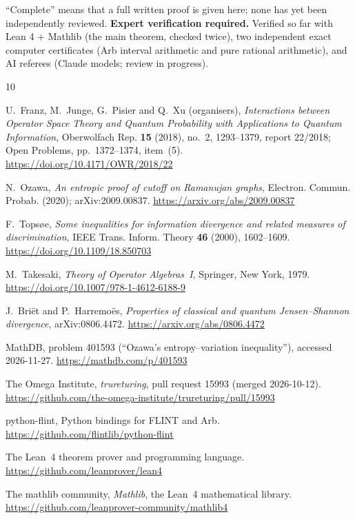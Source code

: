\documentclass[11pt]{amsart}
\theoremstyle{definition}\newtheorem{definition}[theorem]{Definition}
\theoremstyle{remark}\newtheorem{remark}[theorem]{Remark}
\begin{document}
``Complete'' means that a full written proof is given here; none has yet been independently reviewed.  \textbf{Expert verification required.} Verified so far with Lean 4 + Mathlib (the main theorem, checked twice), two independent exact computer certificates (Arb interval arithmetic and pure rational arithmetic), and AI referees (Claude models; review in progress).


\begin{thebibliography}{10}

U.~Franz, M.~Junge, G.~Pisier and Q.~Xu (organisers), \emph{Interactions between Operator Space Theory and Quantum Probability with Applications to Quantum Information}, Oberwolfach Rep. \textbf{15} (2018), no.~2, 1293--1379, report 22/2018; Open Problems, pp.~1372--1374, item~(5).
\url{https://doi.org/10.4171/OWR/2018/22}

N.~Ozawa, \emph{An entropic proof of cutoff on Ramanujan graphs}, Electron. Commun. Probab. (2020); arXiv:2009.00837.
\url{https://arxiv.org/abs/2009.00837}

F.~Tops\o{}e, \emph{Some inequalities for information divergence and related measures of discrimination}, IEEE Trans. Inform. Theory \textbf{46} (2000), 1602--1609.
\url{https://doi.org/10.1109/18.850703}

M.~Takesaki, \emph{Theory of Operator Algebras~I}, Springer, New York, 1979.
\url{https://doi.org/10.1007/978-1-4612-6188-9}

J.~Bri\"et and P.~Harremo\"es, \emph{Properties of classical and quantum Jensen--Shannon divergence}, arXiv:0806.4472.
\url{https://arxiv.org/abs/0806.4472}

MathDB, problem 401593 (``Ozawa's entropy--variation inequality''), accessed 2026-11-27.
\url{https://mathdb.com/p/401593}

The Omega Institute, \emph{trureturing}, pull request 15993 (merged 2026-10-12).
\url{https://github.com/the-omega-institute/trureturing/pull/15993}

python-flint, Python bindings for FLINT and Arb.
\url{https://github.com/flintlib/python-flint}

The Lean~4 theorem prover and programming language.
\url{https://github.com/leanprover/lean4}

The mathlib community, \emph{Mathlib}, the Lean~4 mathematical library.
\url{https://github.com/leanprover-community/mathlib4}

\end{thebibliography}
\end{document}
